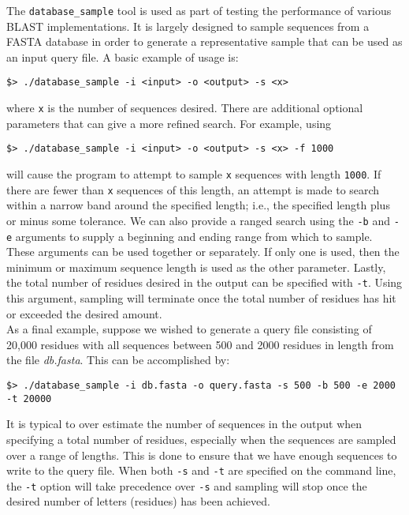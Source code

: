\documentclass[10pt]{article}
\begin{document}
The \verb^database_sample^ tool is used as part of testing the performance of various BLAST implementations.  It is largely designed to sample sequences from a FASTA database in order to generate a representative sample that
can be used as an input query file.  A basic example of usage is:
\begin{verbatim}
$> ./database_sample -i <input> -o <output> -s <x>
\end{verbatim}
\noindent where \verb^x^ is the number of sequences desired.  There are additional optional parameters that can give a more refined search.  For example, using
\begin{verbatim}
$> ./database_sample -i <input> -o <output> -s <x> -f 1000
\end{verbatim}
\noindent will cause the program to attempt to sample \verb^x^ sequences with length \verb^1000^.  If there are fewer than \verb^x^ sequences of this length, an attempt is made to search within a narrow band around the specified length; i.e., the specified
length plus or minus some tolerance.
We can also provide a ranged search using the \verb^-b^ and \verb^-e^ arguments to supply a beginning and ending range from which to sample.  These arguments can be used together or separately.  If only one is used, then the minimum or maximum
sequence length is used as the other parameter.  Lastly, the total number of residues desired in the output can be specified with \verb^-t^.  Using this argument, sampling will terminate once the total number of residues has hit or exceeded the
desired amount.\\

\noindent As a final example, suppose we wished to generate a query file consisting of 20,000 residues with all sequences between 500 and 2000 residues in length from the file \emph{db.fasta}.  This can be accomplished by:
\begin{verbatim}
$> ./database_sample -i db.fasta -o query.fasta -s 500 -b 500 -e 2000 -t 20000
\end{verbatim}
\noindent It is typical to over estimate the number of sequences in the output when specifying a total number of residues, especially when the sequences are sampled over a range of lengths.  This is done to ensure that we have enough sequences
to write to the query file.  When both \verb^-s^ and \verb^-t^ are specified on the command line, the \verb^-t^ option will take precedence over \verb^-s^ and sampling will stop once the desired number of letters (residues) has been achieved.
\end{document}

